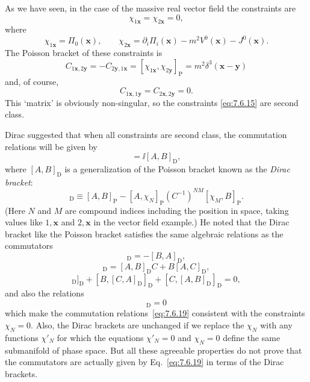 As we have seen, in the case of the massive real vector field the constraints
are
\begin{equation}
\chi_{1\mathbf x}=\chi_{2\mathbf x}=0,
\tag{7.6.15}\label{eq:7.6.15}
\end{equation}
where
\begin{equation}
\chi_{1\mathbf x}=\Pi_0(\mathbf x),\qquad
\chi_{2\mathbf x}=\partial_i\Pi_i(\mathbf x)-m^2V^0(\mathbf x)-J^0(\mathbf x).
\tag{7.6.16}\label{eq:7.6.16}
\end{equation}
The Poisson bracket of these constraints is
\begin{equation}
C_{1\mathbf x,2\mathbf y}=-C_{2\mathbf y,1\mathbf x}
=[\chi_{1\mathbf x},\chi_{2\mathbf y}]_{\mathrm P}
=m^2\delta^3(\mathbf x-\mathbf y)
\tag{7.6.17}\label{eq:7.6.17}
\end{equation}
and, of course,
\begin{equation}
C_{1\mathbf x,1\mathbf y}=C_{2\mathbf x,2\mathbf y}=0.
\tag{7.6.18}\label{eq:7.6.18}
\end{equation}
This `matrix' is obviously non-singular, so the constraints \eqref{eq:7.6.15} are
second class.

Dirac suggested that when all constraints are second class, the commutation
relations will be given by
\begin{equation}
[A,B]=\ii[A,B]_{\mathrm D},
\tag{7.6.19}\label{eq:7.6.19}
\end{equation}
where $[A,B]_{\mathrm D}$ is a generalization of the Poisson bracket known as
the \emph{Dirac bracket}:
\begin{equation}
[A,B]_{\mathrm D}\equiv[A,B]_{\mathrm P}
-[A,\chi_N]_{\mathrm P}(C^{-1})^{NM}[\chi_M,B]_{\mathrm P}.
\tag{7.6.20}\label{eq:7.6.20}
\end{equation}
(Here $N$ and $M$ are compound indices including the position in space,
taking values like $1,\mathbf x$ and $2,\mathbf x$ in the vector field
example.) He noted that the Dirac bracket like the Poisson bracket satisfies
the same algebraic relations as the commutators
\begin{equation}
[A,B]_{\mathrm D}=-[B,A]_{\mathrm D},
\tag{7.6.21}\label{eq:7.6.21}
\end{equation}
\begin{equation}
[A,BC]_{\mathrm D}=[A,B]_{\mathrm D}C+B[A,C]_{\mathrm D},
\tag{7.6.22}\label{eq:7.6.22}
\end{equation}
\begin{equation}
[A,[B,C]_{\mathrm D}]_{\mathrm D}
+[B,[C,A]_{\mathrm D}]_{\mathrm D}
+[C,[A,B]_{\mathrm D}]_{\mathrm D}=0,
\tag{7.6.23}\label{eq:7.6.23}
\end{equation}
and also the relations
\begin{equation}
[\chi_N,B]_{\mathrm D}=0
\tag{7.6.24}\label{eq:7.6.24}
\end{equation}
which make the commutation relations~\eqref{eq:7.6.19} consistent with the constraints
$\chi_N=0$. Also, the Dirac brackets are unchanged if we replace the $\chi_N$
with any functions $\chi'_N$ for which the equations $\chi'_N=0$ and
$\chi_N=0$ define the same submanifold of phase space. But all these
agreeable properties do not prove that the commutators are actually given by
Eq.~\eqref{eq:7.6.19} in terms of the Dirac brackets.


